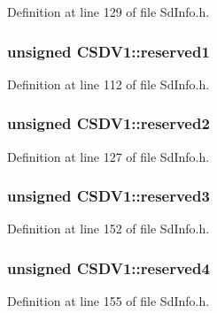 Definition at line 129 of file Sd\+Info.\+h.

\subsubsection[{\texorpdfstring{reserved1}{reserved1}}]{\setlength{\rightskip}{0pt plus 5cm}unsigned C\+S\+D\+V1\+::reserved1}\hypertarget{struct_c_s_d_v1_a8fc5b7146910eb474d3ea3af5fbc504b}{}\label{struct_c_s_d_v1_a8fc5b7146910eb474d3ea3af5fbc504b}


Definition at line 112 of file Sd\+Info.\+h.

\subsubsection[{\texorpdfstring{reserved2}{reserved2}}]{\setlength{\rightskip}{0pt plus 5cm}unsigned C\+S\+D\+V1\+::reserved2}\hypertarget{struct_c_s_d_v1_a3b2832468c7e96a55dbe16a7aadcafd3}{}\label{struct_c_s_d_v1_a3b2832468c7e96a55dbe16a7aadcafd3}


Definition at line 127 of file Sd\+Info.\+h.

\subsubsection[{\texorpdfstring{reserved3}{reserved3}}]{\setlength{\rightskip}{0pt plus 5cm}unsigned C\+S\+D\+V1\+::reserved3}\hypertarget{struct_c_s_d_v1_a427423bc33b20c59941db0b25d60aee9}{}\label{struct_c_s_d_v1_a427423bc33b20c59941db0b25d60aee9}


Definition at line 152 of file Sd\+Info.\+h.

\subsubsection[{\texorpdfstring{reserved4}{reserved4}}]{\setlength{\rightskip}{0pt plus 5cm}unsigned C\+S\+D\+V1\+::reserved4}\hypertarget{struct_c_s_d_v1_a8c0aa397613ce7723033f0f8edccf458}{}\label{struct_c_s_d_v1_a8c0aa397613ce7723033f0f8edccf458}


Definition at line 155 of file Sd\+Info.\+h.

